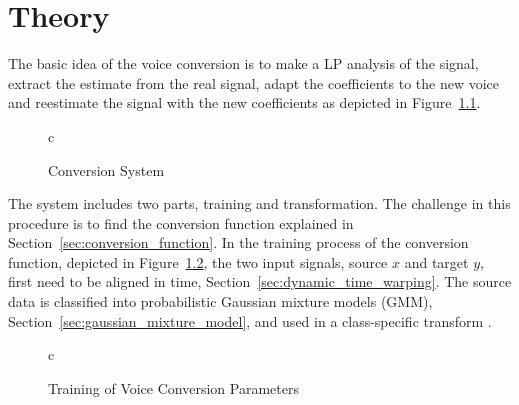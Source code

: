 \chapter{Theory} %
\label{cha:theory}
The basic idea of the voice conversion is to make a LP analysis of the signal, extract the estimate from the real signal, adapt the coefficients to the new voice and reestimate the signal with the new coefficients as depicted in Figure~\ref{fig:VC}.
\begin{figure}[htbp]
  \centering
   \begin{tabular}[h]{c}
  \end{tabular}
  \caption{Conversion System}
  \label{fig:VC}
\end{figure}

The system includes two parts, training and transformation. The challenge in this procedure is to find the conversion function explained in Section~\ref{sec:conversion_function}. In the training process of the conversion function, depicted in Figure~\ref{fig:VC_training}, the two input signals, source $x$ and target $y$, first need to be aligned in time, Section~\ref{sec:dynamic_time_warping}. The source data is classified into probabilistic Gaussian mixture models (GMM), Section~\ref{sec:gaussian_mixture_model}, and used in a class-specific transform \cite{stylianou09}.
\begin{figure}[htbp]
	\centering
	\begin{tabular}[h]{c}
	\end{tabular}
	\caption{Training of Voice Conversion Parameters}
	\label{fig:VC_training}
\end{figure}



